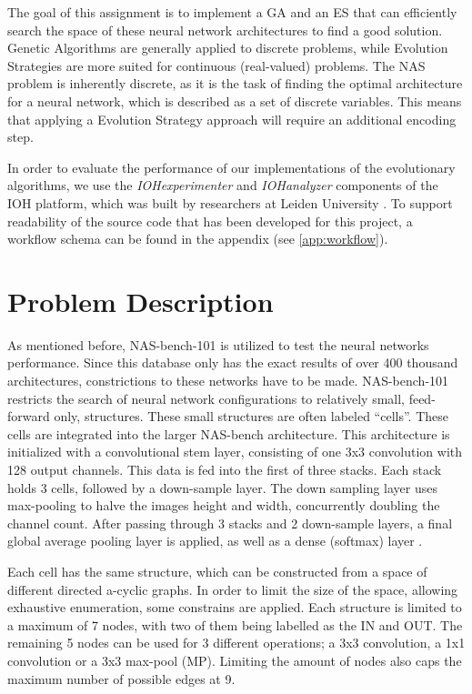 \documentclass{article}
\begin{document}
The goal of this assignment is to implement a GA and an ES that can efficiently search the space of these neural network architectures to find a good solution.
Genetic Algorithms are generally applied to discrete problems, while Evolution Strategies are more suited for continuous (real-valued) problems.
The NAS problem is inherently discrete, as it is the task of finding the optimal architecture for a neural network, which is described as a set of discrete variables.
This means that applying a Evolution Strategy approach will require an additional encoding step.

In order to evaluate the performance of our implementations of the evolutionary algorithms, we use the \textit{IOHexperimenter} and \textit{IOHanalyzer} components of the IOH platform, which was built by researchers at Leiden University \cite{IOH}.
To support readability of the source code that has been developed for this project, a workflow schema can be found in the appendix (see \ref{app:workflow}).



\section{Problem Description}
\label{sec:prob}

As mentioned before, NAS-bench-101 is utilized to test the neural networks performance.
Since this database only has the exact results of over 400 thousand architectures, constrictions to these networks have to be made.
NAS-bench-101 restricts the search of neural network configurations to relatively small, feed-forward only, structures.
These small structures are often labeled ``cells''.
These cells are integrated into the larger NAS-bench architecture.
This architecture is initialized with a convolutional stem layer, consisting of one 3x3 convolution with 128 output channels.
This data is fed into the first of three stacks.
Each stack holds 3 cells, followed by a down-sample layer.
The down sampling layer uses max-pooling to halve the images height and width, concurrently doubling the channel count.
After passing through 3 stacks and 2 down-sample layers, a final global average pooling layer is applied, as well as a dense (softmax) layer \cite{NAS}.

Each cell has the same structure, which can be constructed from a space of different directed a-cyclic graphs.
In order to limit the size of the space, allowing exhaustive enumeration, some constrains are applied.
Each structure is limited to a maximum of 7 nodes, with two of them being labelled as the IN and OUT.
The remaining 5 nodes can be used for 3 different operations; a 3x3 convolution, a 1x1 convolution or a 3x3 max-pool (MP).
Limiting the amount of nodes also caps the maximum number of possible edges at 9.
\end{document}

